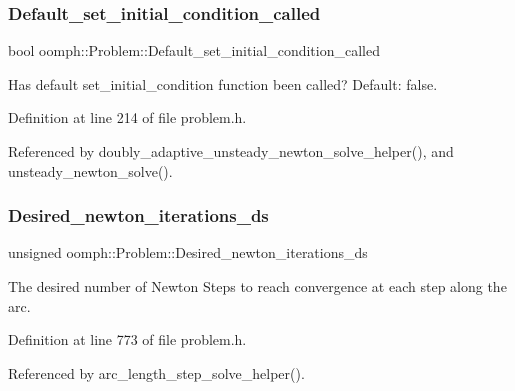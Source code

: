 \subsubsection{\texorpdfstring{Default\+\_\+set\+\_\+initial\+\_\+condition\+\_\+called}{Default\_set\_initial\_condition\_called}}
{\footnotesize\ttfamily bool oomph\+::\+Problem\+::\+Default\+\_\+set\+\_\+initial\+\_\+condition\+\_\+called\hspace{0.3cm}{\ttfamily [private]}}



Has default set\+\_\+initial\+\_\+condition function been called? Default\+: false. 



Definition at line 214 of file problem.\+h.



Referenced by doubly\+\_\+adaptive\+\_\+unsteady\+\_\+newton\+\_\+solve\+\_\+helper(), and unsteady\+\_\+newton\+\_\+solve().

\mbox{\label{classoomph_1_1Problem_abfe8db162a0bda98add0062a45f41cbf}} 
\subsubsection{\texorpdfstring{Desired\+\_\+newton\+\_\+iterations\+\_\+ds}{Desired\_newton\_iterations\_ds}}
{\footnotesize\ttfamily unsigned oomph\+::\+Problem\+::\+Desired\+\_\+newton\+\_\+iterations\+\_\+ds\hspace{0.3cm}{\ttfamily [protected]}}



The desired number of Newton Steps to reach convergence at each step along the arc. 



Definition at line 773 of file problem.\+h.



Referenced by arc\+\_\+length\+\_\+step\+\_\+solve\+\_\+helper().

\mbox{\label{classoomph_1_1Problem_a37fb791188428c8186ffd5c52b6cf576}} 

